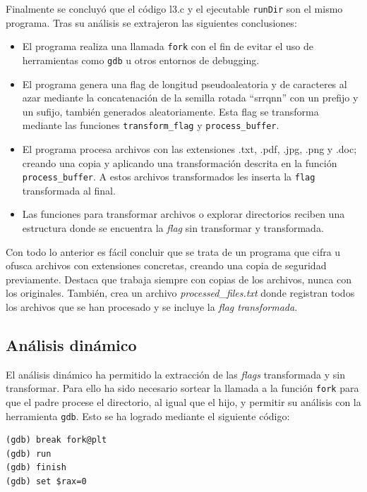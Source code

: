 \documentclass[]{article}
\begin{document}
Finalmente se concluyó que el código l3.c y el ejecutable \texttt{runDir} son el mismo programa. Tras su análisis se extrajeron las siguientes conclusiones:
\begin{itemize}
    \item El programa realiza una llamada \texttt{fork} con el fin de evitar el
    uso de herramientas como \texttt{gdb} u otros entornos de debugging.
    \item El programa genera una flag de longitud pseudoaleatoria y de
    caracteres al azar mediante la concatenación de la semilla rotada
    ``srrqnn'' con un prefijo y un sufijo, también generados aleatoriamente.
    Esta flag se transforma mediante las funciones \texttt{transform\_flag} y
    \texttt{process\_buffer}.
    \item El programa procesa archivos con las extensiones .txt, .pdf, .jpg,
    .png y .doc; creando una copia y aplicando una transformación descrita en
    la función \texttt{process\_buffer}. A estos archivos transformados les
    inserta la \texttt{flag} transformada al final.
    \item Las funciones para transformar archivos o explorar directorios reciben una estructura donde se encuentra la \textit{flag} sin transformar y transformada.
\end{itemize}

Con todo lo anterior es fácil concluir que se trata de un programa que cifra u
ofusca archivos con extensiones concretas, creando una copia de seguridad
previamente. Destaca que trabaja siempre con copias de los archivos, nunca con
los originales. También, crea un archivo \textit{processed\_files.txt} donde
registran todos los archivos que se han procesado y se incluye la \textit{flag
transformada}.

\subsection{Análisis dinámico}
\label{subsec:analisis-dinámico-1}

El análisis dinámico ha permitido la extracción de las \textit{flags} transformada y sin transformar. Para ello ha sido necesario sortear la llamada a la función \texttt{fork} para que el padre procese el directorio, al igual que el hijo, y permitir su análisis con la herramienta \texttt{gdb}. Esto se ha logrado mediante el siguiente código:
\newpage
\begin{lstlisting}[caption=Instrucciones en gdb para esquivar la llamada fork]
(gdb) break fork@plt
(gdb) run
(gdb) finish
(gdb) set $rax=0
\end{lstlisting}
\end{document}
